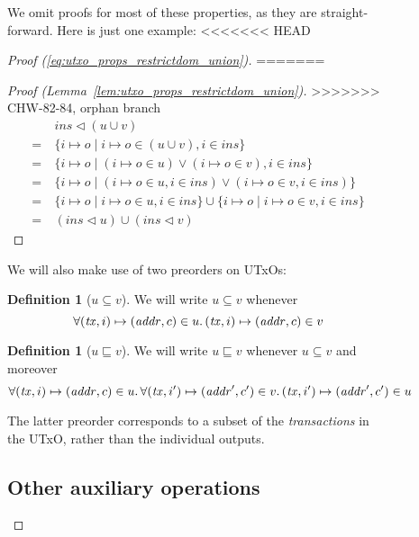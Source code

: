 \documentclass{article}
\newcommand{\restrictdom}{\lhd}
\theoremstyle{definition}{
  \newtheorem{lemma}{Lemma}[section] %
  \newtheorem{definition}[lemma]{Definition}
}
\theoremstyle{theorem}{
  \newtheorem{invariant}[lemma]{Invariant}
  \newtheorem{proofobligation}[lemma]{Proof Obligation}
}
\newtheorem{definition}[lemma]{Definition}
\numberwithin{equation}{lemma}
\begin{document}
\begin{figure}
We omit proofs for most of these properties, as they are straight-forward.
Here is just one example:
%
<<<<<<< HEAD
\begin{proof}[Proof (\eqref{eq:utxo_props_restrictdom_union})]
=======
\begin{proof}[Proof (Lemma~\ref{lem:utxo_props_restrictdom_union})]
>>>>>>> CHW-82-84, orphan branch
\begin{align*}
  & ~ \mathit{ins} \restrictdom (u \cup v) \\
= & ~ \{ i \mapsto o \mid i \mapsto o \in (u \cup v), i \in \mathit{ins} \} \\
= & ~ \{ i \mapsto o \mid (i \mapsto o \in u) \vee (i \mapsto o \in v), i \in \mathit{ins} \} \\
= & ~ \{ i \mapsto o \mid (i \mapsto o \in u, i \in \mathit{ins}) \vee (i \mapsto o \in v, i \in \mathit{ins}) \} \\
= & ~ \{ i \mapsto o \mid i \mapsto o \in u, i \in \mathit{ins} \} \cup \{ i \mapsto o \mid i \mapsto o \in v, i \in \mathit{ins} \} \\
= & ~ (\mathit{ins} \restrictdom u) \cup (\mathit{ins} \restrictdom v)
\end{align*}
\end{proof}

We will also make use of two preorders on UTxOs:

\begin{definition}[$u \subseteq v$]
We will write $u \subseteq v$ whenever
\begin{equation*}
\forall (\mathit{tx}, i)  \mapsto (\mathit{addr}, c) \in u \ldotp
(\mathit{tx}, i)  \mapsto (\mathit{addr}, c) \in v
\end{equation*}
\end{definition}

\begin{definition}[$u \sqsubseteq v$]
We will write $u \sqsubseteq v$ whenever $u \subseteq v$ and moreover
\begin{equation*}
\forall (\mathit{tx}, i)  \mapsto (\mathit{addr}, c) \in u \ldotp
\forall (\mathit{tx}, i') \mapsto (\mathit{addr}', c') \in v \ldotp
(\mathit{tx}, i') \mapsto (\mathit{addr}', c') \in u
\end{equation*}
\end{definition}

The latter preorder corresponds to a subset of the \emph{transactions}
in the UTxO, rather than the individual outputs.

\subsection{Other auxiliary operations}


\end{proof}
\end{figure}
\end{document}

